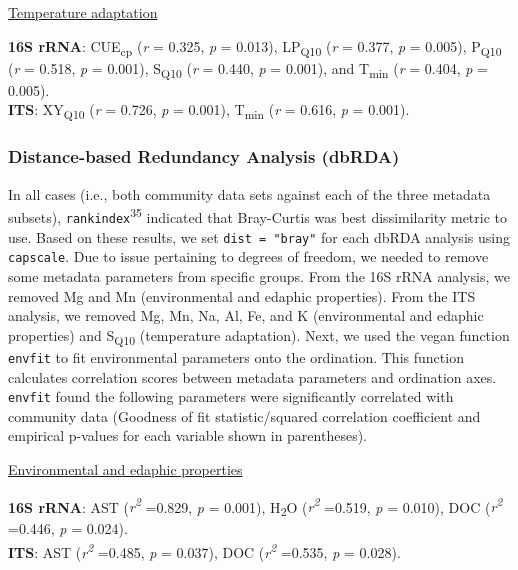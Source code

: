 \documentclass[
  10pt,
  letterpaper,
  DIV=11,
  numbers=noendperiod]{scrartcl}
\begin{document}
\underline{Temperature adaptation}

\textbf{16S rRNA}: CUE\textsubscript{cp} (\emph{r} = 0.325, \emph{p} =
0.013), LP\textsubscript{Q10} (\emph{r} = 0.377, \emph{p} = 0.005),
P\textsubscript{Q10} (\emph{r} = 0.518, \emph{p} = 0.001),
S\textsubscript{Q10} (\emph{r} = 0.440, \emph{p} = 0.001), and
T\textsubscript{min} (\emph{r} = 0.404, \emph{p} = 0.005).\\
\textbf{ITS}: XY\textsubscript{Q10} (\emph{r} = 0.726, \emph{p} =
0.001), T\textsubscript{min} (\emph{r} = 0.616, \emph{p} = 0.001).

\hypertarget{distance-based-redundancy-analysis-dbrda}{%
\subsubsection{Distance-based Redundancy Analysis
(dbRDA)}\label{distance-based-redundancy-analysis-dbrda}}

In all cases (i.e., both community data sets against each of the three
metadata subsets), \texttt{rankindex}\textsuperscript{35} indicated that
Bray-Curtis was best dissimilarity metric to use. Based on these
results, we set \texttt{dist\ =\ "bray"} for each dbRDA analysis using
\texttt{capscale}. Due to issue pertaining to degrees of freedom, we
needed to remove some metadata parameters from specific groups. From the
16S rRNA analysis, we removed Mg and Mn (environmental and edaphic
properties). From the ITS analysis, we removed Mg, Mn, Na, Al, Fe, and K
(environmental and edaphic properties) and S\textsubscript{Q10}
(temperature adaptation). Next, we used the vegan function
\texttt{envfit} to fit environmental parameters onto the ordination.
This function calculates correlation scores between metadata parameters
and ordination axes. \texttt{envfit} found the following parameters were
significantly correlated with community data (Goodness of fit
statistic/squared correlation coefficient and empirical p-values for
each variable shown in parentheses).

\underline{Environmental and edaphic properties}

\textbf{16S rRNA}: AST (\emph{r\textsuperscript{2}} =0.829, \emph{p} =
0.001), H\textsubscript{2}O (\emph{r\textsuperscript{2}} =0.519,
\emph{p} = 0.010), DOC (\emph{r\textsuperscript{2}} =0.446, \emph{p} =
0.024).\\
\textbf{ITS}: AST (\emph{r\textsuperscript{2}} =0.485, \emph{p} =
0.037), DOC (\emph{r\textsuperscript{2}} =0.535, \emph{p} = 0.028).
\end{document}
